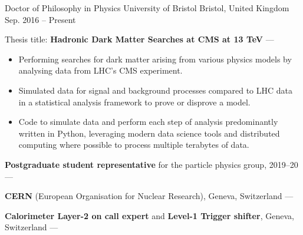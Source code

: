 
\newcommand{\vpaddingEduNorm}{\vspace{1mm}} %
\newcommand{\vpaddingEduSubpoint}{\vspace{0.75mm}} %


\begin{cventries}
    \cventry
        {Doctor of Philosophy in Physics} %
        {University of Bristol} %
        {Bristol, United Kingdom} %
        {Sep. 2016 -- Present} %
        {
        \begin{cvitems} %
            \item {Thesis title: \textbf{Hadronic Dark Matter Searches at CMS at 13 TeV} --- }
            \vpaddingEduSubpoint
            \begin{itemize}
                \item[\bullet]{Performing searches for dark matter arising from various physics models by analysing data from LHC's CMS experiment.}
                \vpaddingEduSubpoint
                \item[\bullet]{Simulated data for signal and background processes compared to LHC data in a statistical analysis framework to prove or disprove a model.}
                \vpaddingEduSubpoint
                \item[\bullet]{Code to simulate data and perform each step of analysis predominantly written in Python, leveraging modern data science tools and distributed computing where possible to process multiple terabytes of data.}
            \end{itemize}
            \vpaddingEduNorm
            \item {\textbf{Postgraduate student representative} for the particle physics group, 2019--20 --- }
            \vpaddingEduNorm
            \item {\textbf{CERN} (European Organisation for Nuclear Research), Geneva, Switzerland --- }
            \vpaddingEduNorm
            \item {\textbf{Calorimeter Layer-2 on call expert} and \textbf{Level-1 Trigger shifter}, Geneva, Switzerland --- }

\end{cvitems}}
\end{cventries}
